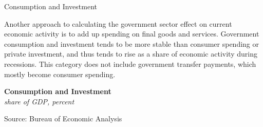 \documentclass{report}
\makeatletter
\newcommand{\tbllink}[1]{\href{https://raw.githubusercontent.com/bdecon/US-chartbook/master/chartbook/data/#1}{\faTable}}
\newcommand*\short[1]{\expandafter\@gobbletwo\number\numexpr#1\relax}
\newcommand{\stdnode}[3]{\node[below, align=left, shift=({#1,#2})]{#3};}
\newcommand{\shdateaxisticks}{
		date coordinates in=x, axis line style={draw=none},
		xmax={2024-07-31},
		max space between ticks=40,	    
		xtick={{1990-01-01}, {1995-01-01}, {2000-01-01}, 
			{2005-01-01}, {2010-01-01}, {2015-01-01}, {2020-01-01}},
		minor xtick={},
		enlarge y limits={0.06}, enlarge x limits={0.01},
		xticklabel style={align=center, yshift=-2pt}, tick label style={inner sep=0pt},
		}
\newcommand{\bbar}[2]{extra #1 ticks = {{#2}}, extra #1 tick labels = ,
		extra #1 tick style = {grid=major, grid style={thick, black!25}},}
\newcommand{\stdline}[4]{\addplot[very thick, no markers, color=#1] 
		table [x=#2, y=#3, col sep=comma] {#4};	}
\newcommand{\rbars}{
		\fill[color=black!10] (axis cs:{1990-07-01},\pgfkeysvalueof{/pgfplots/ymin})
			rectangle (axis cs:{1991-03-01}, \pgfkeysvalueof{/pgfplots/ymax});
		\fill[color=black!10] (axis cs:{2007-12-01},\pgfkeysvalueof{/pgfplots/ymin})
			rectangle (axis cs:{2009-07-01}, \pgfkeysvalueof{/pgfplots/ymax});
		\fill[color=black!10] (axis cs:{2001-03-01},\pgfkeysvalueof{/pgfplots/ymin})
			rectangle (axis cs:{2001-11-01}, \pgfkeysvalueof{/pgfplots/ymax});
		\fill[color=black!10] (axis cs:{2020-02-01},\pgfkeysvalueof{/pgfplots/ymin})
			rectangle (axis cs:{2020-05-01}, \pgfkeysvalueof{/pgfplots/ymax});}
\makeatother
\begin{document}
{\begin{minipage}{0.76\textwidth}
\normalsize Consumption and Investment
\vspace{-1mm}

\small Another approach to calculating the government sector effect on current economic activity is to add up spending on final goods and services. Government consumption and investment tends to be more stable than consumer spending or private investment, and thus tends to rise as a share of economic activity during recessions. This category does not include government transfer payments, which mostly become consumer spending.
\end{minipage}
\vspace{1mm}

\begin{minipage}{0.38\textwidth}
\normalsize \textbf{Consumption and Investment}\\
\footnotesize{\textit{share of GDP, percent}}
\vspace{3.7cm}

\hspace{2mm} 

\footnotesize{Source: Bureau of Economic Analysis} \hfill \tbllink{govci.csv}
\end{minipage}\hspace{5mm}
\begin{minipage}{0.34\textwidth}
\small 
\end{minipage}
\newpage
\hypertarget{govco}{\label{govco}}  
\begin{minipage}{0.76\textwidth}   

\end{minipage}}
\end{document}
